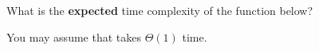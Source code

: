 \begin{prob}
    What is the \textbf{expected} time complexity of the function below?

    You may assume that  takes $\Theta(1)$
    time.

    \inputminted[lastline=15]{python}{\thisdir/code.py}


\end{prob}
